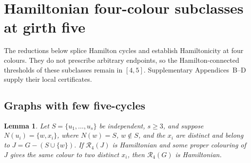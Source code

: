 \documentclass[11pt]{article}
\newtheorem{lemma}[theorem]{Lemma}
\theoremstyle{remark}
\newcommand{\R}{\mathcal R}
\numberwithin{equation}{section}
\numberwithin{table}{section}
\begin{document}
\section{Hamiltonian four-colour subclasses at girth five}
\label{sec:four-colour-subclasses}

The reductions below splice Hamilton cycles and establish
Hamiltonicity at four colours. They do not prescribe arbitrary
endpoints, so the Hamilton-connected thresholds of these subclasses
remain in $[4,5]$. Supplementary Appendices~B--D supply their local
certificates.

\subsection{Graphs with few five-cycles}
\begin{lemma}
\label{lem:subdivided-star-four-subclass}
Let $S=\{u_1,\ldots,u_s\}$ be independent, $s\ge3$, and suppose
$N(u_i)=\{w,x_i\}$, where $N(w)=S$, $w\notin S$, and the $x_i$ are distinct and belong to
$J=G-(S\cup\{w\})$.  If $\R_4(J)$ is Hamiltonian and some proper colouring
of $J$ gives the same colour to two distinct $x_i$, then $\R_4(G)$ is
Hamiltonian.
\end{lemma}
\end{document}
